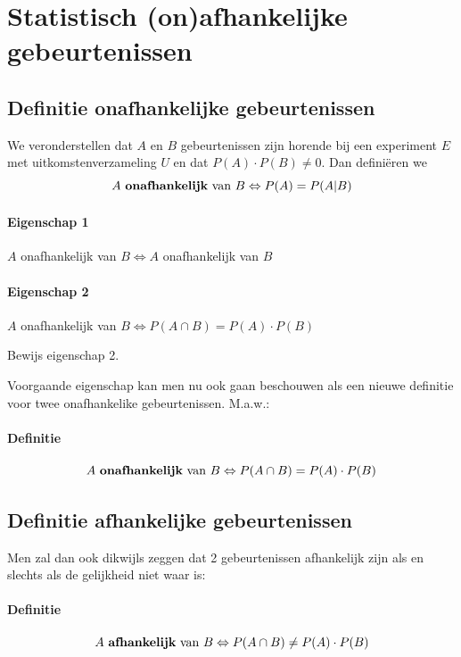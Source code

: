 \documentclass[12pt,twoside]{article}
\begin{document}
\pagebreak
\section{Statistisch (on)afhankelijke gebeurtenissen}

\subsection{Definitie onafhankelijke gebeurtenissen}

We veronderstellen dat $A$ en $B$ gebeurtenissen zijn horende bij een experiment $E$ met uitkomstenverzameling $U$ en dat $P(A)\cdot P(B) \neq 0$. Dan definiëren we
$$A \mbox{ {\bf onafhankelijk} van } B \Leftrightarrow P(A)=P(A|B)$$

\paragraph*{Eigenschap 1} $A$ onafhankelijk van $B \Leftrightarrow A$ onafhankelijk van $B$

\paragraph*{Eigenschap 2} $A$ onafhankelijk van $B \Leftrightarrow P(A\cap B)=P(A)\cdot P(B)$

\begin{oefening}
Bewijs eigenschap 2.
\end{oefening}

Voorgaande eigenschap kan men nu ook gaan beschouwen als een nieuwe definitie voor twee onafhankelike gebeurtenissen. M.a.w.:

\paragraph*{Definitie}
\begin{mdframed}
$$A \mbox{ {\bf onafhankelijk} van } B \Leftrightarrow P(A\cap B)=P(A)\cdot P(B)$$
\end{mdframed}

\subsection{Definitie afhankelijke gebeurtenissen}

 Men zal dan ook dikwijls zeggen dat 2 gebeurtenissen afhankelijk zijn als en slechts als de gelijkheid niet waar is:

\paragraph*{Definitie}
\begin{mdframed}
$$A \mbox{ {\bf afhankelijk} van } B \Leftrightarrow P(A\cap B)\neq P(A)\cdot P(B)$$
\end{mdframed}
\end{document}
